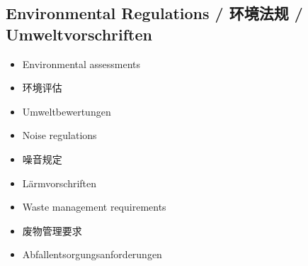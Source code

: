 \subsection{Environmental Regulations / 环境法规 / Umweltvorschriften}
\begin{itemize}
    \item Environmental assessments
    \item 环境评估
    \item Umweltbewertungen
    \item Noise regulations
    \item 噪音规定
    \item Lärmvorschriften
    \item Waste management requirements
    \item 废物管理要求
    \item Abfallentsorgungsanforderungen
\end{itemize}
